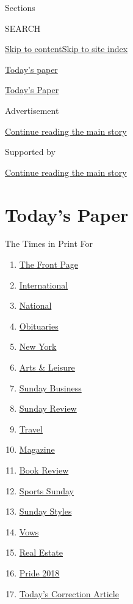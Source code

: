 Sections

SEARCH

\protect\hyperlink{site-content}{Skip to
content}\protect\hyperlink{site-index}{Skip to site index}

\href{https://www.nytimes3xbfgragh.onion/section/todayspaper}{Today's
paper}

\href{https://myaccount.nytimes3xbfgragh.onion/auth/login?response_type=cookie\&client_id=vi}{}

\href{https://www.nytimes3xbfgragh.onion/section/todayspaper}{Today's
Paper}

Advertisement

\protect\hyperlink{after-top}{Continue reading the main story}

Supported by

\protect\hyperlink{after-sponsor}{Continue reading the main story}

\hypertarget{todays-paper}{%
\section{Today's Paper}\label{todays-paper}}

The Times in Print For

\begin{enumerate}
\def\labelenumi{\arabic{enumi}.}
\tightlist
\item
  \protect\hyperlink{thefrontpage}{The Front Page}
\item
  \protect\hyperlink{international}{International}
\item
  \protect\hyperlink{national}{National}
\item
  \protect\hyperlink{obituaries}{Obituaries}
\item
  \protect\hyperlink{newyork}{New York}
\item
  \protect\hyperlink{artsux5cux26leisure}{Arts \& Leisure}
\item
  \protect\hyperlink{sundaybusiness}{Sunday Business}
\item
  \protect\hyperlink{sundayreview}{Sunday Review}
\item
  \protect\hyperlink{travel}{Travel}
\item
  \protect\hyperlink{magazine}{Magazine}
\item
  \protect\hyperlink{bookreview}{Book Review}
\item
  \protect\hyperlink{sportssunday}{Sports Sunday}
\item
  \protect\hyperlink{sundaystyles}{Sunday Styles}
\item
  \protect\hyperlink{vows}{Vows}
\item
  \protect\hyperlink{realestate}{Real Estate}
\item
  \protect\hyperlink{pride2018}{Pride 2018}
\item
  \protect\hyperlink{todayux27scorrectionarticle}{Today's Correction
  Article}
\end{enumerate}

